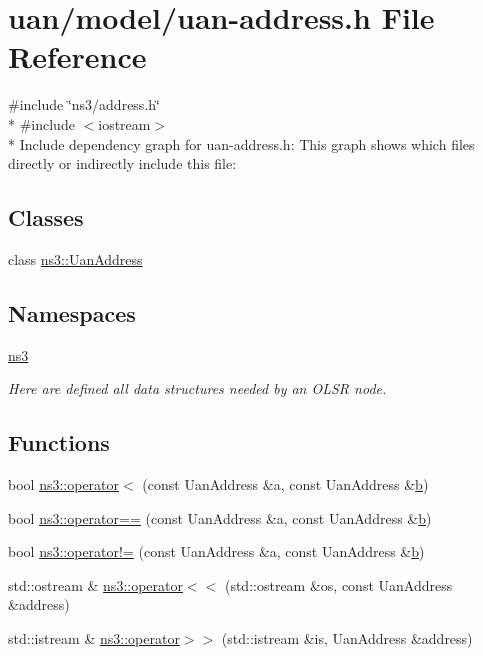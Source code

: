 \hypertarget{uan-address_8h}{}\section{uan/model/uan-\/address.h File Reference}
\label{uan-address_8h}
{\ttfamily \#include \char`\"{}ns3/address.\+h\char`\"{}}\\*
{\ttfamily \#include $<$iostream$>$}\\*
Include dependency graph for uan-\/address.h\+:
This graph shows which files directly or indirectly include this file\+:
\subsection*{Classes}
\begin{DoxyCompactItemize}
\item 
class \hyperlink{classns3_1_1UanAddress}{ns3\+::\+Uan\+Address}
\end{DoxyCompactItemize}
\subsection*{Namespaces}
\begin{DoxyCompactItemize}
\item 
 \hyperlink{namespacens3}{ns3}
\begin{DoxyCompactList}\small\item\em Here are defined all data structures needed by an O\+L\+SR node. \end{DoxyCompactList}\end{DoxyCompactItemize}
\subsection*{Functions}
\begin{DoxyCompactItemize}
\item 
bool \hyperlink{namespacens3_a4e164634d259f221f73be7c6e9568fa1}{ns3\+::operator$<$} (const Uan\+Address \&a, const Uan\+Address \&\hyperlink{lte__pathloss_8m_a21ad0bd836b90d08f4cf640b4c298e7c}{b})
\item 
bool \hyperlink{namespacens3_a477f04ddfcb7de32ae7aa5b4580b74ee}{ns3\+::operator==} (const Uan\+Address \&a, const Uan\+Address \&\hyperlink{lte__pathloss_8m_a21ad0bd836b90d08f4cf640b4c298e7c}{b})
\item 
bool \hyperlink{namespacens3_aff92bf91afb562dae9481b2de7a6e8c9}{ns3\+::operator!=} (const Uan\+Address \&a, const Uan\+Address \&\hyperlink{lte__pathloss_8m_a21ad0bd836b90d08f4cf640b4c298e7c}{b})
\item 
std\+::ostream \& \hyperlink{namespacens3_aaddc30e0b41c8c47380bac7ee7b29cbe}{ns3\+::operator$<$$<$} (std\+::ostream \&os, const Uan\+Address \&address)
\item 
std\+::istream \& \hyperlink{namespacens3_a0afe2a857cd06951b3b101de2e0c1540}{ns3\+::operator$>$$>$} (std\+::istream \&is, Uan\+Address \&address)
\end{DoxyCompactItemize}
